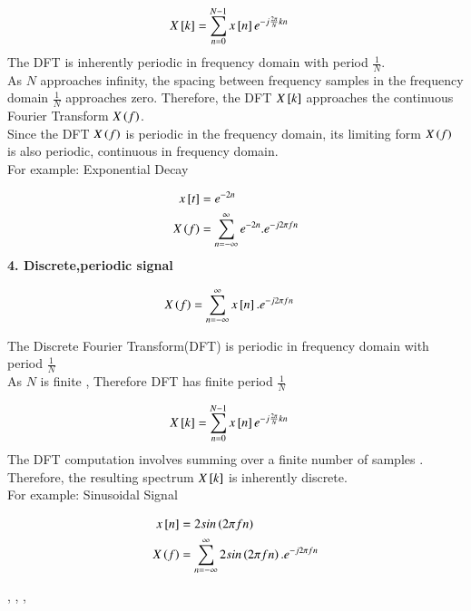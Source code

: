 \documentclass[journal,12pt,onecolumn]{IEEEtran}
\theoremstyle{remark}
\begin{document}
\begin{align}
X{}\left[k\right]&=\sum_{n=0}^{N-1}x{}\left[n\right]e^{-j\frac{2\pi}{N}kn}
\end{align}
The DFT is inherently periodic in frequency domain with period $\frac{1}{N}$.\\


As  $N$ approaches infinity, the spacing between frequency samples in the frequency domain  $\frac{1}{N}$  approaches zero. Therefore, the DFT $X{}\left[k\right]$ approaches the continuous Fourier Transform $X\left(f\right)$. \\

Since the DFT $X\left(f\right)$  is periodic in the frequency domain, its limiting form $X\left(f\right)$ is also periodic, continuous in frequency domain.\\

For example: Exponential Decay

\begin{align}
x{}\left[t\right]&= e^{-2n}\\
X\left(f\right)&= \sum_{n=-\infty}^{\infty} e^{-2n}.e^{-j2\pi fn}
\end{align}
\vspace{2mm}
\textbf{4. Discrete,periodic signal}

\begin{align}
X\left(f\right)&= \sum_{n=-\infty}^{\infty} x{}\left[n\right].e^{-j2\pi fn}
\end{align}

The Discrete Fourier Transform(DFT) is periodic in frequency domain with period $\frac{1}{N}$\\

As $N$ is finite , Therefore DFT has finite period $\frac{1}{N}$

\begin{align}
X{}\left[k\right]&=\sum_{n=0}^{N-1}x{}\left[n\right]e^{-j\frac{2\pi}{N}kn}
\end{align}
The DFT computation involves summing over a finite number of samples . Therefore, the resulting spectrum  $X{}\left[k\right]$ is inherently discrete.\\

For example:  Sinusoidal Signal

\begin{align}
x{}\left[n\right]&=2sin\left(2\pi fn\right)\\
X\left(f\right)&= \sum_{n=-\infty}^{\infty} 2sin\left(2\pi fn\right).e^{-j2\pi fn}
\end{align}

 \textrightarrow {}   ,   \textrightarrow {}   ,    \textrightarrow {}   ,    \textrightarrow {}
\end{document}
